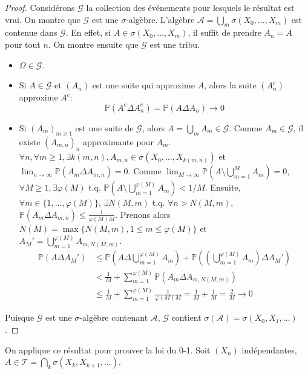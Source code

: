 \begin{proof}
Considérons $\mathcal{G}$ la collection des événements pour lesquels le résultat est vrai. On montre que $\mathcal{G}$ est une $\sigma$-algèbre.
L'algèbre $\mathcal{A} = \bigcup_m \sigma(X_0, \dots, X_m)$ est contenue dans $\mathcal{G}$. En effet, si $A \in \sigma(X_0, \dots, X_m)$, il suffit de prendre $A_n=A$ pour tout $n$.
On montre ensuite que $\mathcal{G}$ est une tribu.
\begin{itemize}
    \item $\Omega \in \mathcal{G}$.
    \item Si $A \in \mathcal{G}$ et $(A_n)$ est une suite qui approxime $A$, alors la suite $(A_n^c)$ approxime $A^c$:
    \[ \mathbb{P}(A^c \Delta A_n^c) = \mathbb{P}(A \Delta A_n) \to 0 \]
    \item Si $(A_m)_{m \ge 1}$ est une suite de $\mathcal{G}$, alors $A = \bigcup_m A_m \in \mathcal{G}$.
    Comme $A_m \in \mathcal{G}$, il existe $(A_{m,n})_n$ approximante pour $A_m$.
    $\forall n, \forall m \ge 1, \exists k(m,n), A_{m,n} \in \sigma(X_0, \dots, X_{k(m,n)})$ et $\lim_{n \to \infty} \mathbb{P}(A_m \Delta A_{m,n}) = 0$.
    Comme $\lim_{M \to \infty} \mathbb{P}(A \setminus \bigcup_{m=1}^M A_m) = 0$, $\forall M \ge 1, \exists \varphi(M)$ t.q. $\mathbb{P}(A \setminus \bigcup_{m=1}^{\varphi(M)} A_m) < 1/M$.
    Ensuite, $\forall m \in \{1, \dots, \varphi(M)\}$, $\exists N(M,m)$ t.q. $\forall n > N(M,m)$, $\mathbb{P}(A_m \Delta A_{m,n}) \le \frac{1}{\varphi(M)M}$.
    Prenons alors $N(M) = \max\{N(M,m), 1 \le m \le \varphi(M)\}$ et $A_M' = \bigcup_{m=1}^{\varphi(M)} A_{m, N(M,m)}$.
    \begin{align*}
        \mathbb{P}(A \Delta A_M') &\le \mathbb{P}\left(A \Delta \bigcup_{m=1}^{\varphi(M)} A_m\right) + \mathbb{P}\left(\left(\bigcup_{m=1}^{\varphi(M)} A_m\right) \Delta A_M'\right) \\
        &< \frac{1}{M} + \sum_{m=1}^{\varphi(M)} \mathbb{P}(A_m \Delta A_{m,N(M,m)}) \\
        &\le \frac{1}{M} + \sum_{m=1}^{\varphi(M)} \frac{1}{\varphi(M)M} = \frac{1}{M} + \frac{1}{M} = \frac{2}{M} \to 0
    \end{align*}
\end{itemize}
Puisque $\mathcal{G}$ est une $\sigma$-algèbre contenant $\mathcal{A}$, $\mathcal{G}$ contient $\sigma(\mathcal{A}) = \sigma(X_0, X_1, \dots)$.
\end{proof}
On applique ce résultat pour prouver la loi du 0-1. Soit $(X_n)$ indépendantes, $A \in \mathcal{T} = \bigcap_k \sigma(X_k, X_{k+1}, \dots)$.
